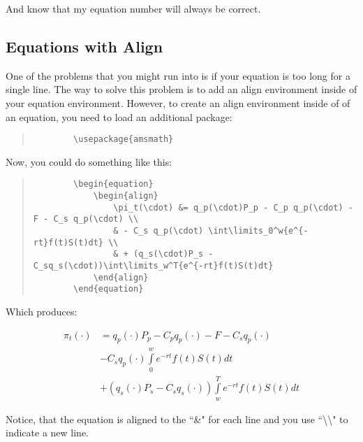 And know that my equation number will always be correct.

\subsection{Equations with Align}

One of the problems that you might run into is if your equation is too long for a single line.  The way to solve this problem is to add an align environment inside of your equation environment.  However, to create an align environment inside of of an equation, you need to load an additional package:

\begin{quote}
	\begin{verbatim}
		\usepackage{amsmath}
	\end{verbatim}
\end{quote}

Now, you could do something like this:

\begin{quote}
	\begin{verbatim}
		\begin{equation}
			\begin{align}
	  			\pi_t(\cdot) &= q_p(\cdot)P_p - C_p q_p(\cdot) - F - C_s q_p(\cdot) \\
	  			& - C_s q_p(\cdot) \int\limits_0^w{e^{-rt}f(t)S(t)dt} \\
	  			& + (q_s(\cdot)P_s - C_sq_s(\cdot))\int\limits_w^T{e^{-rt}f(t)S(t)dt}
	 		\end{align}
		\end{equation}
	\end{verbatim}
\end{quote}

Which produces:

\begin{equation}
	\begin{align}
		\pi_t(\cdot) &= q_p(\cdot)P_p - C_p q_p(\cdot) - F - C_s q_p(\cdot) \\
	  	& - C_s q_p(\cdot) \int\limits_0^w{e^{-rt}f(t)S(t)dt} \\
	  	& + (q_s(\cdot)P_s - C_sq_s(\cdot))\int\limits_w^T{e^{-rt}f(t)S(t)dt}
	 \end{align}
\end{equation}

Notice, that the equation is aligned to the ``\&" for each line and you use ``\textbackslash \textbackslash" to indicate a new line.

